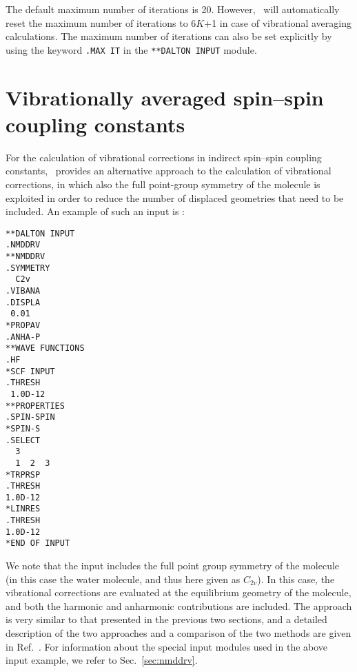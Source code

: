 The default maximum number of iterations is 20. However, \dalton\ will
automatically reset the maximum number of iterations to 6$K$+1 in case
of vibrational averaging calculations. The maximum number of
iterations can also be set explicitly by using
the keyword \verb|.MAX IT| in the \verb|**DALTON INPUT| module.

\section{Vibrationally averaged spin--spin coupling constants}

For the calculation of vibrational corrections in indirect spin--spin
coupling constants, \dalton\ provides an alternative approach to the
calculation of vibrational corrections, in which also the full
point-group symmetry of the molecule is exploited in order to
reduce the number of displaced geometries that need to be included. An
example of such an input is :

\begin{verbatim}
**DALTON INPUT
.NMDDRV
**NMDDRV
.SYMMETRY
  C2v
.VIBANA
.DISPLA
 0.01
*PROPAV
.ANHA-P
**WAVE FUNCTIONS
.HF
*SCF INPUT
.THRESH
 1.0D-12
**PROPERTIES
.SPIN-SPIN
*SPIN-S
.SELECT
  3
  1  2  3
*TRPRSP
.THRESH
1.0D-12
*LINRES
.THRESH
1.0D-12
*END OF INPUT
\end{verbatim}

We note that the input includes the full point group symmetry of the
molecule (in this case the water molecule, and thus here given as
$C_{2v}$). In this case, the vibrational corrections are evaluated at
the equilibrium geometry of the molecule, and both the harmonic and
anharmonic contributions are included. The approach is very similar to
that presented in the previous two sections, and a detailed
description of the two approaches and a comparison of the two methods
are given in Ref.~\cite{tarkr}. For information about the special input
modules used in the above input example, we refer to
Sec.~\ref{sec:nmddrv}. 
